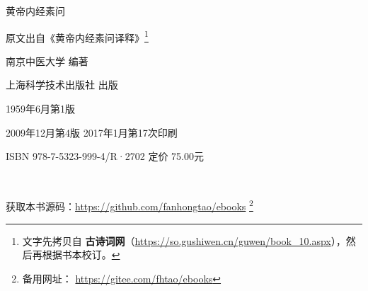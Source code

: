 \begin{titlepage}
    \begin{center}
        \vspace*{3cm}

        {\Huge 黄帝内经素问}

        \vfill


        原文出自《黄帝内经素问译释》\footnote{文字先拷贝自 \textbf{古诗词网}（\url{https://so.gushiwen.cn/guwen/book_10.aspx}），然后再根据书本校订。}

        南京中医大学  \quad 编著

        上海科学技术出版社 \quad  出版

        1959年6月第1版

        2009年12月第4版 \qquad 2017年1月第17次印刷

        ISBN 978-7-5323-999-4/R·2702 \quad 定价 75.00元

        \,

        获取本书源码：\url{https://github.com/fanhongtao/ebooks} \footnote{备用网址： \url{https://gitee.com/fhtao/ebooks} }
    \end{center}
 \end{titlepage}
